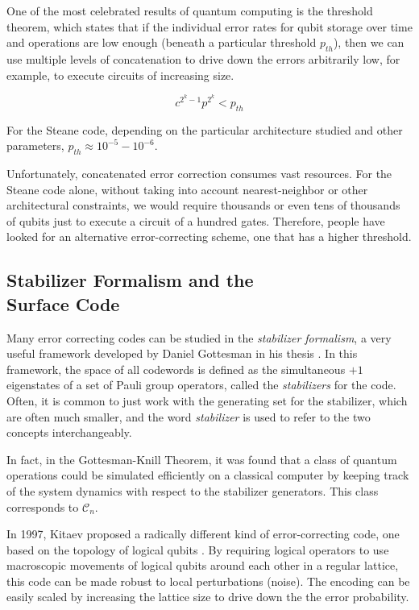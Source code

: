 One of the most celebrated results of quantum computing is the threshold
theorem, which states that if the individual error rates for qubit storage
over time and operations are low enough (beneath a particular threshold $p_{th}$),
then we can use multiple levels of concatenation to drive down the errors
arbitrarily low, for example, to execute circuits of increasing size.

\begin{displaymath}
c^{2^k-1}p^{2^k} < p_{th}
\end{displaymath}

For the Steane code, depending on the particular architecture studied and
other parameters, $p_{th} \approx 10^{-5} - 10^{-6}$.

Unfortunately, concatenated error correction consumes vast resources.
For the Steane code alone, without
taking into account nearest-neighbor or other architectural constraints, we
would require thousands or even tens of thousands of qubits just to execute a
circuit of a hundred gates. Therefore, people have looked for an alternative
error-correcting scheme, one that has a higher threshold.

\subsection{Stabilizer Formalism and the \\ Surface Code}

Many error correcting codes can be studied in the \emph{stabilizer formalism},
a very useful framework developed by Daniel Gottesman in his thesis
\cite{Gottesman1997}. In this framework, the space of all codewords is
defined as the simultaneous $+1$ eigenstates of a set of Pauli group
operators, called the \emph{stabilizers} for the code. Often, it is common
to just work with the generating set for the stabilizer, which are often
much smaller, and the word \emph{stabilizer} is used to refer to the two
concepts interchangeably.

In fact, in the Gottesman-Knill Theorem, it was found that a class of quantum
operations could be simulated efficiently on a classical
computer by keeping track of the system dynamics with respect to the
stabilizer generators. This class corresponds to $\mathcal{C}_n$.

In 1997, Kitaev proposed a radically different kind of error-correcting code,
one based on the topology of logical qubits \cite{Fowler2009}.
By requiring logical operators to
use macroscopic movements of logical qubits around each other in a regular
lattice, this code can be made robust to local perturbations (noise). The
encoding can be easily scaled by increasing the lattice size to drive down the
the error probability.

